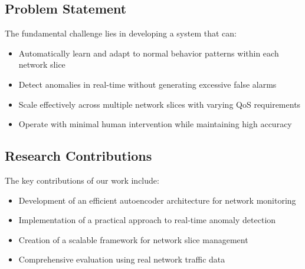 \documentclass[12pt, a4paper]{article}
\begin{document}
\subsection{Problem Statement}
The fundamental challenge lies in developing a system that can:
\begin{itemize}
    \item Automatically learn and adapt to normal behavior patterns within each network slice
    \item Detect anomalies in real-time without generating excessive false alarms
    \item Scale effectively across multiple network slices with varying QoS requirements
    \item Operate with minimal human intervention while maintaining high accuracy
\end{itemize}

\subsection{Research Contributions}
The key contributions of our work include:
\begin{itemize}
    \item Development of an efficient autoencoder architecture for network monitoring
    \item Implementation of a practical approach to real-time anomaly detection
    \item Creation of a scalable framework for network slice management
    \item Comprehensive evaluation using real network traffic data
\end{itemize}
\end{document}
